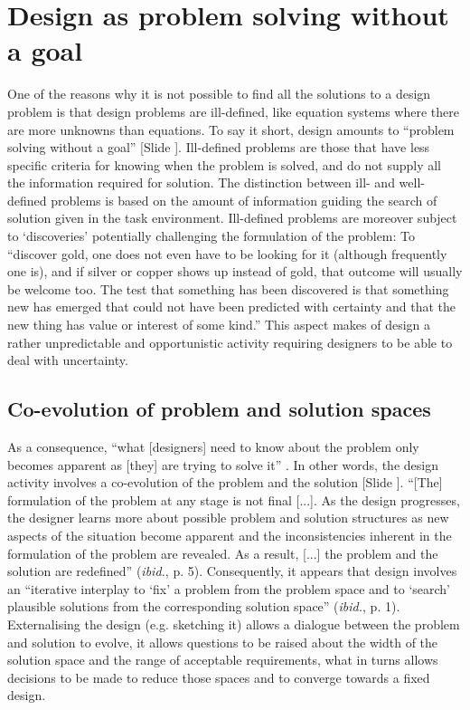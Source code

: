 \documentclass{article}
\newcounter{slide}
\begin{document}
\section{Design as problem solving without a goal}
\label{sec:illdefined}
One of the reasons why it is not possible to find all the solutions to a design problem is that design problems are ill-defined, like equation systems where there are more unknowns than equations. To say it short, design amounts to ``problem solving without a goal'' \cite[p. 106]{simon1996sciences} {\color{blue}[Slide ]}. Ill-defined problems are those that have less specific criteria for knowing when the problem is solved, and do not supply all the information required for solution. The distinction between ill- and well-defined problems is based on the amount of information guiding the search of solution given in the task environment. Ill-defined problems are moreover subject to `discoveries' potentially challenging the formulation of the problem: To ``discover gold, one does not even have to be looking for it (although frequently one is), and if silver or copper shows up instead of gold, that outcome will usually be welcome too. The test that something has been discovered is that something new has emerged that could not have been predicted with certainty and that the new thing has value or interest of some kind.'' This aspect makes of design a rather unpredictable and opportunistic activity requiring designers to be able to deal with uncertainty.

\subsection{Co-evolution of problem and solution spaces}
\label{sec:coevolution}
As a consequence, ``what [designers] need to know about the problem only becomes apparent as [they] are trying to solve it'' \cite{cross2011design}. In other words, the design activity involves a co-evolution of the problem and the solution \cite{maherFormalisingDesignExploration1996} {\color{blue}[Slide ]}. ``[The] formulation of the problem at any stage is not final [...]. As the design progresses, the designer learns more about possible problem and solution structures as new aspects of the situation become apparent and the inconsistencies inherent in the formulation of the problem are revealed. As a result, [...] the problem and the solution are redefined'' (\emph{ibid.}, p. 5). Consequently, it appears that design involves an ``iterative interplay to `fix' a problem from the problem space and to `search' plausible solutions from the corresponding solution space'' (\emph{ibid.}, p. 1). Externalising the design (e.g. sketching it) allows a dialogue between the problem and solution to evolve, it allows questions to be raised about the width of the solution space and the range of acceptable requirements, what in turns allows decisions to be made to reduce those spaces and to converge towards a fixed design.
\end{document}
